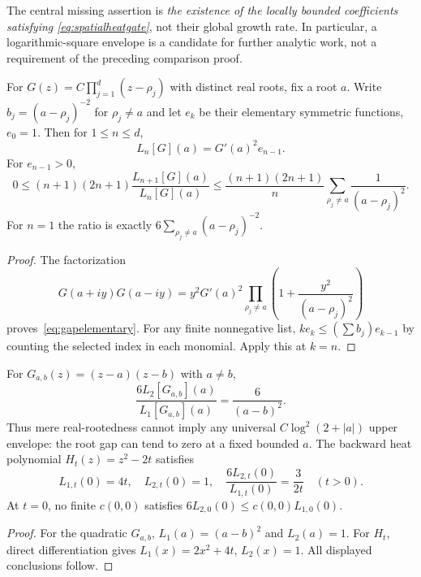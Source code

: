 The central missing assertion is
\emph{the existence of the locally bounded
coefficients satisfying
\eqref{eq:spatialheatgate}}, not their
global growth rate. In particular, a
logarithmic-square envelope is a candidate
for further analytic work, not a requirement
of the preceding comparison proof.

\begin{proposition}
\label{prop:gapspatial}
For $G(z)=C\prod_{j=1}^d(z-\rho_j)$
with distinct real roots, fix a root $a$.
Write $b_j=(a-\rho_j)^{-2}$ for $\rho_j\ne a$
and let $e_k$ be their elementary
symmetric functions, $e_0=1$.
Then for $1\le n\le d$,
\begin{equation}
L_n[G](a)=G'(a)^2 e_{n-1}.
\label{eq:gapelementary}
\end{equation}
For $e_{n-1}>0$,
\begin{equation}
0\le
(n+1)(2n+1)\frac{L_{n+1}[G](a)}{L_n[G](a)}
\le\frac{(n+1)(2n+1)}{n}
\sum_{\rho_j\ne a}\frac1{(a-\rho_j)^2}.
\label{eq:gapspatial}
\end{equation}
For $n=1$ the ratio is exactly
$6\sum_{\rho_j\ne a}(a-\rho_j)^{-2}$.
\end{proposition}
\begin{proof}
The factorization
\[
G(a+iy)G(a-iy)
=y^2G'(a)^2
\prod_{\rho_j\ne a}
\left(1+\frac{y^2}{(a-\rho_j)^2}\right)
\]
proves~\eqref{eq:gapelementary}.
For any finite nonnegative list,
$ke_k\le(\sum b_j)e_{k-1}$
by counting the selected index in
each monomial. Apply this at $k=n$.
\end{proof}

\begin{proposition}
\label{prop:spatialcollision}
For $G_{a,b}(z)=(z-a)(z-b)$ with $a\ne b$,
\[
\frac{6L_2[G_{a,b}](a)}{L_1[G_{a,b}](a)}
=\frac6{(a-b)^2}.
\]
Thus mere real-rootedness cannot imply any
universal $C\log^2(2+|a|)$ upper envelope:
the root gap can tend to zero at a fixed
bounded $a$. The backward heat polynomial
$H_t(z)=z^2-2t$ satisfies
\[
L_{1,t}(0)=4t,\quad L_{2,t}(0)=1,\quad
\frac{6L_{2,t}(0)}{L_{1,t}(0)}
=\frac3{2t}\quad(t>0).
\]
At $t=0$, no finite $c(0,0)$ satisfies
$6L_{2,0}(0)\le c(0,0)L_{1,0}(0)$.
\end{proposition}
\begin{proof}
For the quadratic $G_{a,b}$,
$L_1(a)=(a-b)^2$ and $L_2(a)=1$.
For $H_t$, direct differentiation gives
$L_1(x)=2x^2+4t$, $L_2(x)=1$.
All displayed conclusions follow.
\end{proof}


